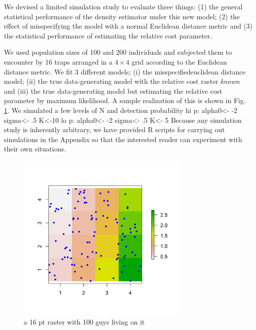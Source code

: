 We devised a limited simulation study to evaluate three things: (1) the general statistical performance
of the density estimator under this new model; (2) the effect of misspecifying the model with
a normal Euclidean distance metric and (3) the statistical performance of estimating the relative
cost parameter. 

We used population sizes of 100 and 200 individuals and subjected them to encounter by 16 traps
arranged in a $4\times 4$ grid according to the Euclidean distance metric. We fit 3 different 
models; (i) the misspecifiedeuclidean distance model; (ii) the true data-generating model with
the relative cost raster {\it known} and (iii) the true data-generating model but estimating
the relative cost parameter by maximum likelihood. 
A sample realization of this is shown in Fig. 
\ref{ecoldist.fig.raster100}.
We simulated a few levels of N and detection probability 
hi p: alpha0<- -2     sigma<- .5    K<-10
lo p: alpha0<- -2     sigma<- .5    K<- 5
Because any simulation study is inherently arbitrary, we have provided R scripts
for carrying out simulations in the Appendix so that the interested reader can experiment with
their own situations.

\begin{figure}
\begin{center}
\includegraphics[height=3.25in,width=3.25in]{Ch10/figs/raster_withN100}
\end{center}
\caption{a 16 pt raster with 100 guys living on it}
\label{ecoldist.fig.raster100}
\end{figure}
 


